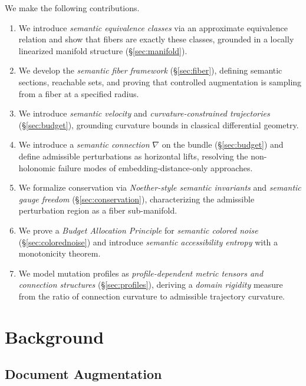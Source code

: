 \documentclass[12pt, a4paper]{article}
\theoremstyle{plain}
\theoremstyle{definition}
\theoremstyle{remark}
\newcommand{\connD}{\nabla}
\begin{document}
We make the following contributions.

\begin{enumerate}[label=(\roman*)]
\item We introduce \emph{semantic equivalence classes} via an approximate
  equivalence relation and show that fibers are exactly these classes,
  grounded in a locally linearized manifold structure (\S\ref{sec:manifold}).
\item We develop the \emph{semantic fiber framework} (\S\ref{sec:fiber}),
  defining semantic sections, reachable sets, and proving that controlled
  augmentation is sampling from a fiber at a specified radius.
\item We introduce \emph{semantic velocity} and \emph{curvature-constrained
  trajectories} (\S\ref{sec:budget}), grounding curvature bounds in classical
  differential geometry.
\item We introduce a \emph{semantic connection} $\connD$ on the bundle
  (\S\ref{sec:budget}) and define admissible perturbations as horizontal lifts,
  resolving the non-holonomic failure modes of embedding-distance-only approaches.
\item We formalize conservation via \emph{Noether-style semantic invariants}
  and \emph{semantic gauge freedom} (\S\ref{sec:conservation}), characterizing
  the admissible perturbation region as a fiber sub-manifold.
\item We prove a \emph{Budget Allocation Principle} for \emph{semantic colored
  noise} (\S\ref{sec:colorednoise}) and introduce \emph{semantic accessibility
  entropy} with a monotonicity theorem.
\item We model mutation profiles as \emph{profile-dependent metric tensors and
  connection structures} (\S\ref{sec:profiles}), deriving a \emph{domain
  rigidity} measure from the ratio of connection curvature to admissible
  trajectory curvature.
\end{enumerate}


\section{Background}
\label{sec:background}

\subsection{Document Augmentation}
\end{document}

